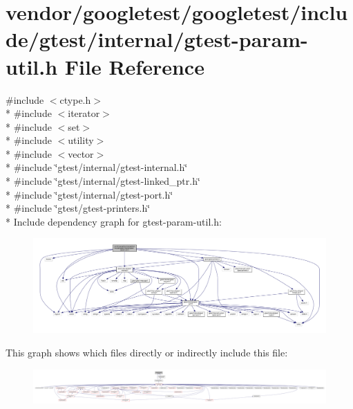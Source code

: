 \hypertarget{gtest-param-util_8h}{}\section{vendor/googletest/googletest/include/gtest/internal/gtest-\/param-\/util.h File Reference}
\label{gtest-param-util_8h}
{\ttfamily \#include $<$ctype.\+h$>$}\\*
{\ttfamily \#include $<$iterator$>$}\\*
{\ttfamily \#include $<$set$>$}\\*
{\ttfamily \#include $<$utility$>$}\\*
{\ttfamily \#include $<$vector$>$}\\*
{\ttfamily \#include \char`\"{}gtest/internal/gtest-\/internal.\+h\char`\"{}}\\*
{\ttfamily \#include \char`\"{}gtest/internal/gtest-\/linked\+\_\+ptr.\+h\char`\"{}}\\*
{\ttfamily \#include \char`\"{}gtest/internal/gtest-\/port.\+h\char`\"{}}\\*
{\ttfamily \#include \char`\"{}gtest/gtest-\/printers.\+h\char`\"{}}\\*
Include dependency graph for gtest-\/param-\/util.h\+:
\nopagebreak
\begin{figure}[H]
\begin{center}
\leavevmode
\includegraphics[width=350pt]{gtest-param-util_8h__incl}
\end{center}
\end{figure}
This graph shows which files directly or indirectly include this file\+:
\nopagebreak
\begin{figure}[H]
\begin{center}
\leavevmode
\includegraphics[width=350pt]{gtest-param-util_8h__dep__incl}
\end{center}
\end{figure}
